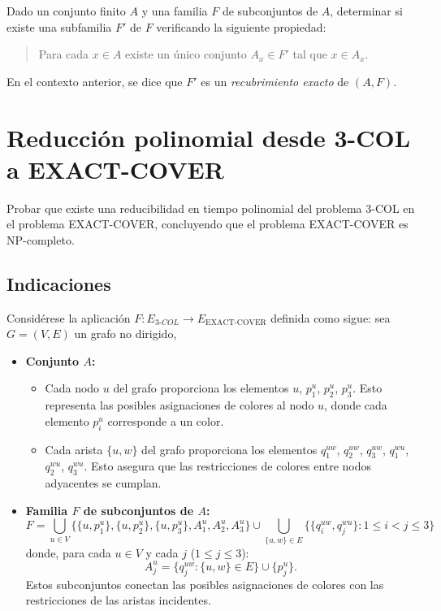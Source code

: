 \documentclass[12pt]{article}
\begin{document}
Dado un conjunto finito $A$ y una familia $F$ de subconjuntos de $A$, determinar si existe una subfamilia $F'$ de $F$ verificando la siguiente propiedad:
\begin{quote}
Para cada $x \in A$ existe un único conjunto $A_x \in F'$ tal que $x \in A_x$.
\end{quote}
En el contexto anterior, se dice que $F'$ es un \textit{recubrimiento exacto} de $(A, F)$. 

\section*{Reducción polinomial desde 3-COL a EXACT-COVER}
Probar que existe una reducibilidad en tiempo polinomial del problema 3-COL en el problema EXACT-COVER, concluyendo que el problema EXACT-COVER es NP-completo.

\subsection*{Indicaciones}
Considérese la aplicación $F : E_{3\text{-}COL} \to E_{\text{EXACT-COVER}}$ definida como sigue: sea $G = (V, E)$ un grafo no dirigido,
\begin{itemize}
    \item \textbf{Conjunto $A$:}
    \begin{itemize}
        \item Cada nodo $u$ del grafo proporciona los elementos $u$, $p_1^u$, $p_2^u$, $p_3^u$. Esto representa las posibles asignaciones de colores al nodo $u$, donde cada elemento $p_i^u$ corresponde a un color.
        \item Cada arista $\{u, w\}$ del grafo proporciona los elementos $q_1^{uw}$, $q_2^{uw}$, $q_3^{uw}$, $q_1^{wu}$, $q_2^{wu}$, $q_3^{wu}$. Esto asegura que las restricciones de colores entre nodos adyacentes se cumplan.
    \end{itemize}
    \item \textbf{Familia $F$ de subconjuntos de $A$:}
    \[
    F = \bigcup_{u \in V}\big\{
        \{u, p_1^u\}, \{u, p_2^u\}, \{u, p_3^u\}, A_1^u, A_2^u, A_3^u
    \big\} \cup \bigcup_{\{u, w\} \in E} \big\{
        \{q_i^{uw}, q_j^{wu}\} : 1 \leq i < j \leq 3
    \big\}
    \]
    donde, para cada $u \in V$ y cada $j$ ($1 \leq j \leq 3$):
    \[
    A_j^u = \{q_j^{uw} : \{u, w\} \in E\} \cup \{p_j^u\}.
    \]
    Estos subconjuntos conectan las posibles asignaciones de colores con las restricciones de las aristas incidentes.
\end{itemize}
\end{document}

